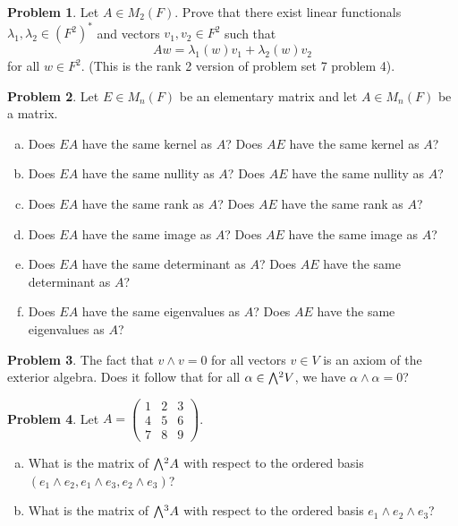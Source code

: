 \documentclass[11pt,oneside]{amsart}
\theoremstyle{definition}
\newtheorem{problem}{Problem}
\newcommand{\extp}{\mathchoice{{\textstyle\bigwedge}}%
    {{\bigwedge}}%
    {{\textstyle\wedge}}%
    {{\scriptstyle\wedge}}}
\begin{document}
    \begin{problem}
        Let $A\in M_2(F)$. Prove that there exist linear functionals $\lambda_1,\lambda_2\in (F^2)^*$ and vectors $v_1,v_2\in F^2$ such that
        \[Aw=\lambda_1(w)v_1+\lambda_2(w)v_2\]
        for all $w\in F^2$. (This is the rank 2 version of problem set 7 problem 4).
    \end{problem}

    \begin{problem}
        Let $E\in M_n(F)$ be an elementary matrix and let $A\in M_n(F)$ be a matrix.
        \begin{enumerate}[(a)]
            \item Does $EA$ have the same kernel as $A$? Does $AE$ have the same kernel as $A$?
            \item Does $EA$ have the same nullity as $A$? Does $AE$ have the same nullity as $A$?
            \item Does $EA$ have the same rank as $A$? Does $AE$ have the same rank as $A$?
            \item Does $EA$ have the same image as $A$? Does $AE$ have the same image as $A$?
            \item Does $EA$ have the same determinant as $A$? Does $AE$ have the same determinant as $A$?
            \item Does $EA$ have the same eigenvalues as $A$? Does $AE$ have the same eigenvalues as $A$?
        \end{enumerate}
    \end{problem}

    \begin{problem}
        The fact that $v\wedge v=0$ for all vectors $v\in V$ is an axiom of the exterior algebra. Does it follow that for all $\alpha\in\extp^2 V$, we have $\alpha\wedge\alpha=0$?
    \end{problem}
    
    \begin{problem}
        Let $A=\begin{pmatrix}
            1&2&3\\4&5&6\\7&8&9
        \end{pmatrix}$. 
        \begin{enumerate}[(a)]
            \item What is the matrix of $\extp^2 A$ with respect to the ordered basis $(e_1\wedge e_2, e_1\wedge e_3,e_2\wedge e_3)$?
            \item What is the matrix of $\extp^3 A$ with respect to the ordered basis $e_1\wedge e_2\wedge e_3$?
        \end{enumerate}
    \end{problem}
\end{document}
